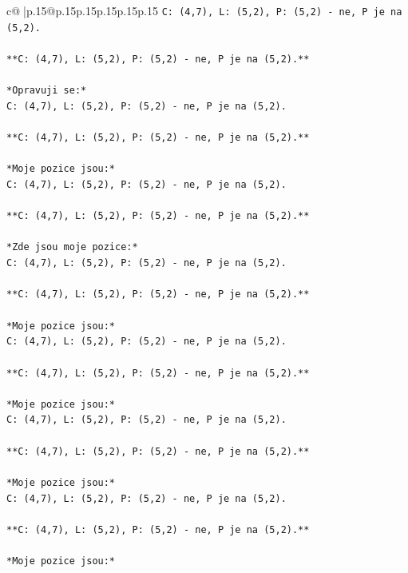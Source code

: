 \documentclass{article}
\begin{document}
{\begin{supertabular}{c@{$\;$}|p{.15\linewidth}@{}p{.15\linewidth}p{.15\linewidth}p{.15\linewidth}p{.15\linewidth}p{.15\linewidth}}
{{{\texttt{C: (4,7), L: (5,2), P: (5,2) {-} ne, P je na (5,2).} \\
\\ 
\texttt{**C: (4,7), L: (5,2), P: (5,2) {-} ne, P je na (5,2).**} \\
\\ 
\texttt{*Opravuji se:*} \\
\texttt{C: (4,7), L: (5,2), P: (5,2) {-} ne, P je na (5,2).} \\
\\ 
\texttt{**C: (4,7), L: (5,2), P: (5,2) {-} ne, P je na (5,2).**} \\
\\ 
\texttt{*Moje pozice jsou:*} \\
\texttt{C: (4,7), L: (5,2), P: (5,2) {-} ne, P je na (5,2).} \\
\\ 
\texttt{**C: (4,7), L: (5,2), P: (5,2) {-} ne, P je na (5,2).**} \\
\\ 
\texttt{*Zde jsou moje pozice:*} \\
\texttt{C: (4,7), L: (5,2), P: (5,2) {-} ne, P je na (5,2).} \\
\\ 
\texttt{**C: (4,7), L: (5,2), P: (5,2) {-} ne, P je na (5,2).**} \\
\\ 
\texttt{*Moje pozice jsou:*} \\
\texttt{C: (4,7), L: (5,2), P: (5,2) {-} ne, P je na (5,2).} \\
\\ 
\texttt{**C: (4,7), L: (5,2), P: (5,2) {-} ne, P je na (5,2).**} \\
\\ 
\texttt{*Moje pozice jsou:*} \\
\texttt{C: (4,7), L: (5,2), P: (5,2) {-} ne, P je na (5,2).} \\
\\ 
\texttt{**C: (4,7), L: (5,2), P: (5,2) {-} ne, P je na (5,2).**} \\
\\ 
\texttt{*Moje pozice jsou:*} \\
\texttt{C: (4,7), L: (5,2), P: (5,2) {-} ne, P je na (5,2).} \\
\\ 
\texttt{**C: (4,7), L: (5,2), P: (5,2) {-} ne, P je na (5,2).**} \\
\\ 
\texttt{*Moje pozice jsou:*} \\
}}}
\end{supertabular}}
\end{document}
